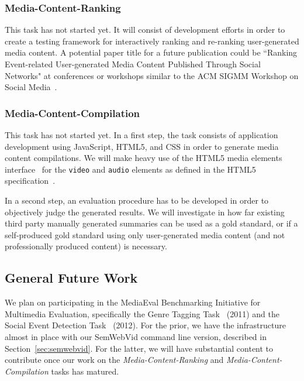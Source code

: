\documentclass[12pt]{article}
\begin{document}
\subsubsection{Media-Content-Ranking}
This task has not started yet. It will consist of development efforts in order to create a testing framework for interactively ranking and re-ranking user-generated media content. A potential paper title for a future publication could be ``Ranking Event-related User-generated Media Content Published Through Social Networks" at conferences or workshops similar to the ACM SIGMM Workshop on Social Media~\cite{wsm2011}.

\subsubsection{Media-Content-Compilation}
This task has not started yet. In a first step, the task consists of application development using JavaScript, HTML5, and CSS in order to generate media content compilations. We will make heavy use of the HTML5 media elements interface~\cite{mediaelements} for the \texttt{video} and \texttt{audio} elements as defined in the HTML5 specification~\cite{w3c_html5}.

In a second step, an evaluation procedure has to be developed in order to objectively judge the generated results. We will investigate in how far existing third party manually generated summaries can be used as a gold standard, or if a self-produced gold standard using only user-generated media content (and not professionally produced content) is necessary.
 
 \subsection{General Future Work} 
We plan on participating in the MediaEval Benchmarking Initiative for Multimedia Evaluation, specifically the Genre Tagging Task~\cite{mediaevalgenre} (2011) and the Social Event Detection Task~\cite{mediaevalevent} (2012). For the prior, we have the infrastructure almost in place with our SemWebVid command line version, described in Section~\ref{sec:semwebvid}. For the latter, we will have substantial content to contribute once our work on the \emph{Media-Content-Ranking} and \emph{Media-Content-Compilation} tasks has matured.
\end{document}
